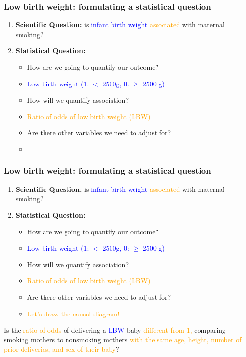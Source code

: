 \documentclass[12pt, 
hyperref={colorlinks=true, linkcolor=blue, urlcolor=cyan}]{beamer}
\begin{document}
\begin{frame}[noframenumbering]
\frametitle{Low birth weight: formulating a statistical question}
\begin{enumerate}
\item \textbf{Scientific Question:} is \textcolor{blue}{infant birth weight} \textcolor{orange}{associated} with maternal smoking?
\item \textbf{Statistical Question:} 
	\begin{itemize}
	\item How are we going to quantify our outcome?
	\item[] \textcolor{blue}{Low birth weight (1: $<$ 2500g, 0: $\ge$ 2500 g)}
	\item How will we quantify association?
	\item[] \textcolor{orange}{Ratio of odds of low birth weight (LBW)}
	\item Are there other variables we need to adjust for?
	\item[]
	\end{itemize}
\end{enumerate}
\end{frame}

\begin{frame}[noframenumbering]
\frametitle{Low birth weight: formulating a statistical question}
\begin{enumerate}
\item \textbf{Scientific Question:} is \textcolor{blue}{infant birth weight} \textcolor{orange}{associated} with maternal smoking?
\item \textbf{Statistical Question:} 
	\begin{itemize}
	\item How are we going to quantify our outcome?
	\item[] \textcolor{blue}{Low birth weight (1: $<$ 2500g, 0: $\ge$ 2500 g)}
	\item How will we quantify association?
	\item[] \textcolor{orange}{Ratio of odds of low birth weight (LBW)}
	\item Are there other variables we need to adjust for?
	\item[] \textcolor{orange}{Let's draw the causal diagram!} \pause
	\end{itemize}
\end{enumerate}

Is the \textcolor{orange}{ratio of odds} of delivering a \textcolor{blue}{LBW} baby \textcolor{orange}{different from 1,} comparing smoking mothers to nonsmoking mothers \textcolor{orange}{with the same age, height, number of prior deliveries, and sex of their baby}?

\end{frame}
\end{document}

